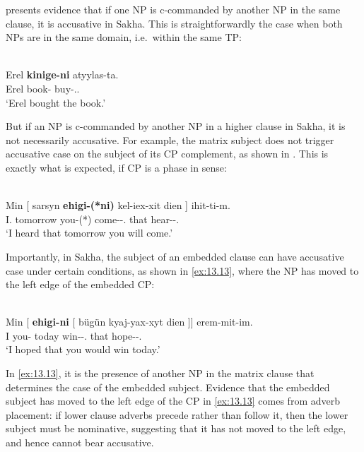 \documentclass[output=paper]{langsci/langscibook}
\begin{document}
\textcite[112f.]{Baker2015} presents evidence that if one NP is c-commanded by
another NP in the same clause, it is accusative in Sakha. This is
straightforwardly the case when both NPs are in the same domain, i.e.\ within
the same TP:

\ea%
    \label{ex:13.11} \parencite[112]{Baker2015}\\
    \gll  Erel  \textbf{kinige-ni}  atyylas-ta.\\
          Erel book-\Acc{}  buy-\Pst{}.\Tsg.\Sbj{}\\
    \glt  ‘Erel bought the book.’
\z

But if an NP is c-commanded by another NP in a higher clause in Sakha, it is
not necessarily accusative. For example, the matrix subject does not trigger
accusative case on the subject of its CP complement, as shown in
. This is exactly what is expected, if CP is a
phase in  sense:

\ea%
    \label{ex:13.12} \parencite[113]{Baker2015}\\
    \gll  Min    [ sarsyn \textbf{ehigi-(*ni)}  kel-iex-xit dien ] ihit-ti-m.\\
          I.\Nom{} {} tomorrow you-(*\Acc)  come-\Fut{}-\Spl.\Sbj{}  that {} hear-\Pst{}-\Fsg.\Sbj{}\\
    \glt  ‘I heard that tomorrow you will come.’
\z

Importantly, in Sakha, the subject of an embedded clause can have accusative
case under certain conditions, as shown in \eqref{ex:13.13}, where the NP has
moved to the left edge of the embedded CP:

\ea%
    \label{ex:13.13} \parencite[114]{Baker2015}\\
    \gll  Min [ \textbf{ehigi-ni} [ bügün kyaj-yax-xyt dien ]]  erem-mit-im.\\
    I {} you-\Acc{} {} today win-\Fut{}-\Tpl.\Sbj{}  that {} hope-\Ptcp{}-\Fsg.\Sbj{}\\
    \glt  ‘I hoped that you would win today.’
\z

In \eqref{ex:13.13}, it is the presence of another NP in the matrix clause that
determines the case of the embedded subject. Evidence that the embedded subject
has moved to the left edge of the CP in \eqref{ex:13.13} comes from adverb
placement: if lower clause adverbs precede rather than follow it, then the
lower subject must be nominative, suggesting that it has not moved to the left
edge, and hence cannot bear accusative.
\end{document}
